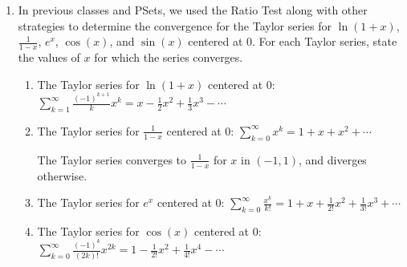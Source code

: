 \documentclass[main]{subfiles}
\begin{document}
\begin{enumerate}
   
  \item  {}


In previous classes and PSets, we used the Ratio Test along with other strategies to determine the convergence for the Taylor series for $\ln(1+x)$, $\displaystyle\frac{1}{1-x}$, $e^x$, $\cos(x)$, and $\sin(x)$ centered at 0. For each Taylor series, state the values of $x$ for which the series converges. %

\begin{enumerate}
\item 
\begin{problem}[\vfill]
The Taylor series for $\ln(1 + x)$ centered at 0: $\displaystyle \sum_{k=1}^\infty
   \frac{(-1)^{k+1}}{k}x^k = x - \frac{1}{2}x^2 + \frac{1}{3}x^3 - \cdots$
\end{problem}

\begin{solution}
\fbox{$(-1,1]$}
\end{solution}

\item \begin{problem}[\vfill]
   The Taylor series for $\displaystyle \frac{1}{1 - x}$ centered at 0:
    $\displaystyle \sum_{k=0}^\infty x^k = 1 + x + x^2 + \cdots$
\end{problem}

\begin{solution}
The Taylor series converges to $\frac{1}{1-x}$ for $x$ in $(-1,1)$, and diverges otherwise.
\end{solution}

\item 
\begin{problem}[\vfill]
The Taylor series for $e^x$ centered at 0: $\displaystyle \sum_{k=0}^\infty
    \frac{x^k}{k!} = 1+x + \frac{1}{2!}x^2 + \frac{1}{3!}x^3 + \cdots$
\end{problem}


\begin{solution}
\fbox{$(-\infty,\infty)$}
\end{solution}


\item 
\begin{problem}[\vfill]
The Taylor series for $\cos(x)$ centered at 0: $\displaystyle \sum_{k=0}^\infty
    \frac{(-1)^k}{(2k)!}x^{2k} = 1- \frac{1}{2!}x^2 + \frac{1}{4!}x^4 - \cdots$
\end{problem}



\end{enumerate}
\end{enumerate}
\end{document}
